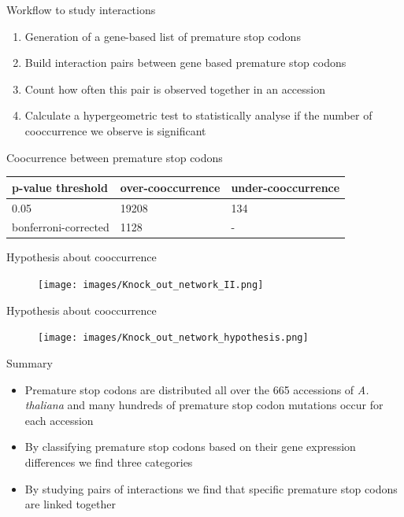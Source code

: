 \documentclass{beamer}
\begin{document}
\begin{frame}{Workflow to study interactions}
	\begin{enumerate}
		\item Generation of a gene-based list of premature stop codons 
		\item Build interaction pairs between gene based premature stop codons 
		\item Count how often this pair is observed together in an accession 
		\item Calculate a hypergeometric test to statistically analyse if the number of cooccurrence we observe is significant
	\end{enumerate}
\end{frame}
\begin{frame}{Coocurrence between premature stop codons}
	\begin{table}[tb]
		\label{tab:Coocurrence}
		\centering
		\begin{tabular}{|l|l|l|}
		\hline
		\textbf{p-value threshold} & \textbf{over-cooccurrence}  &  \textbf{under-cooccurrence}  \\ \hline
		0.05 & 19208 &  134 \\ \hline
		bonferroni-corrected & 1128 &  - \\ \hline
		\end{tabular}
		\end{table}
\end{frame}
\begin{frame}{Hypothesis about cooccurrence}
	\begin{figure}[tb]
		\centering
		\begin{minipage}[h]{1\textwidth}
		\centering
		\texttt{[image: images/Knock\_out\_network\_II.png]}
		\label{fig:Example_Network_with_knock_outII}
		\end{minipage}
	\end{figure}
\end{frame}
\begin{frame}{Hypothesis about cooccurrence}
	\begin{figure}[tb]
		\centering
		\begin{minipage}[h]{1\textwidth}
		\centering
		\texttt{[image: images/Knock\_out\_network\_hypothesis.png]}
		\label{fig:Example_Network_with_knock_outII}
		\end{minipage}
	\end{figure}
\end{frame}
\begin{frame}{Summary}
	\begin{itemize}
		\item Premature stop codons are distributed all over the 665 accessions of \textit{A. thaliana} and many hundreds of premature stop codon mutations occur for each accession
		\item By classifying premature stop codons based on their gene expression differences we find three categories 
		\item By studying pairs of interactions we find that specific premature stop codons are linked together 
	\end{itemize}
\end{frame}
\end{document}
